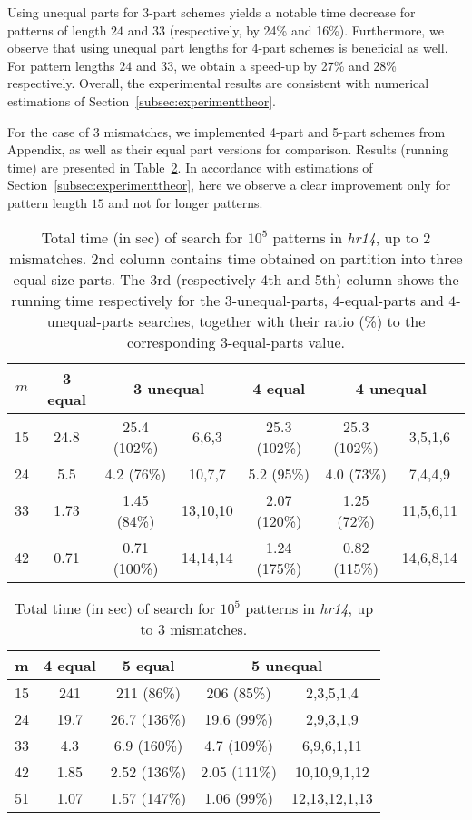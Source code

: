 \documentclass[12pt]{article}
\begin{document}
Using unequal parts for 3-part schemes yields a notable time decrease 
for patterns of length $24$ and $33$ (respectively, by 24\% and 16\%). 
Furthermore, we observe that
using unequal part lengths for 4-part schemes is beneficial as
well. For pattern lengths $24$ and $33$, we obtain a speed-up by
27\% and 28\% respectively.
Overall, the experimental results are consistent with numerical
estimations of Section~\ref{subsec:experimenttheor}. 

For the case of 3 mismatches, we implemented 4-part and 5-part schemes
from Appendix, as well as their equal part
versions for comparison. Results (running time) are presented in
Table~\ref{tab:times3}. In accordance with estimations of
Section~\ref{subsec:experimenttheor}, here we observe a clear
improvement only for pattern length $15$ and not for longer
patterns.

\begin{table}[!tb]
\caption{Total time (in sec) of search for $10^5$ patterns
in \emph{hr14}, up to 2 mismatches.
2nd column contains time obtained on partition into three equal-size parts. 
The 3rd (respectively 4th and 5th) column shows the running time
respectively for the $3$-unequal-parts, 
$4$-equal-parts and
$4$-unequal-parts searches, together with their ratio (\%) to the
corresponding $3$-equal-parts value.
\label{tab:times2}}
\centering
\begin{tabular}{|c|c|c|c|c|c|c|}
\hline
$m$ & 3 equal & \multicolumn{2}{|c|}{3 unequal} & 4 equal & \multicolumn{2}{|c|}{4 unequal} \\
\hline
15 & 24.8 & 25.4 (102\%) & 6,6,3 & 25.3 (102\%) & 25.3 (102\%) & 3,5,1,6 \\
24 & 5.5 & 4.2 (76\%)  & 10,7,7 & 5.2 (95\%) & 4.0 (73\%) & 7,4,4,9 \\
33 & 1.73  & 1.45 (84\%)   & 13,10,10 & 2.07 (120\%)  & 1.25 (72\%) & 11,5,6,11 \\
42 & 0.71  & 0.71 (100\%)  & 14,14,14 & 1.24 (175\%)  & 0.82 (115\%) & 14,6,8,14 \\
\hline
\end{tabular}
\end{table}



\begin{table}[!tb]
\caption{Total time (in sec) of search for $10^5$ patterns
  in \emph{hr14}, up to 3 mismatches.
\label{tab:times3}}
\centering
\begin{tabular}{|c|c|c|c|c|}
\hline
m & 4 equal & 5 equal & \multicolumn{2}{|c|}{5 unequal} \\
\hline
15 & 241 & 211 (86\%) & 206 (85\%) & 2,3,5,1,4 \\
24 & 19.7 & 26.7 (136\%) & 19.6 (99\%) & 2,9,3,1,9 \\
33 & 4.3 & 6.9 (160\%) & 4.7 (109\%) & 6,9,6,1,11 \\
42 & 1.85 & 2.52 (136\%) & 2.05 (111\%) & 10,10,9,1,12 \\
51 & 1.07 & 1.57 (147\%) & 1.06 (99\%) & 12,13,12,1,13 \\
\hline
\end{tabular}
\end{table}
\end{document}
